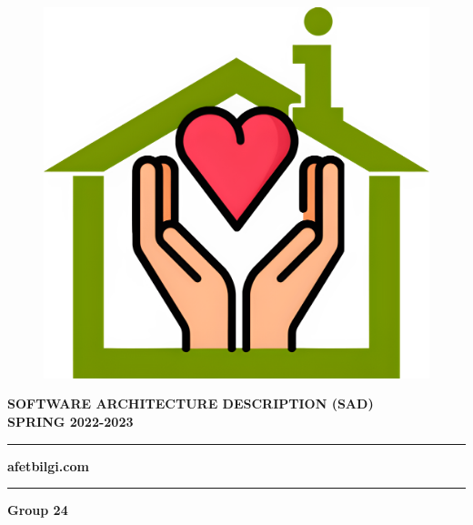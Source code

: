 \begin{titlepage}
\begin{center}
  \begin{figure}[ht]
    \centering
    \includegraphics[width=.5\linewidth]{img/afetbilgi.jpg}
  \end{figure}

  \vspace{16pt}
  \large{
    \textbf{SOFTWARE ARCHITECTURE DESCRIPTION (SAD)}
  } \\
  \large{
    \textbf{SPRING 2022-2023}
  }

  \rule{12cm}{1pt}

  \large{\textbf{afetbilgi.com}}
  \vspace{-7pt}

  \rule{12cm}{1pt}
  
  \vspace{24pt}
  \Large{\textbf{Group 24}}

  \vspace{48pt}
  \begin{minipage}{.45\textwidth}
    \centering
  \end{minipage}
  \hfill
  \begin{minipage}{.45\textwidth}
    \centering
  \end{minipage}  
  \end{center}
\end{titlepage}
  